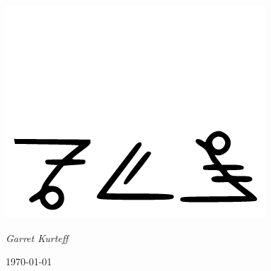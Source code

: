 \begin{titlepage}
\centering
	{\huge\bfseries \kurango \par}
	\begin{center}
	{\includegraphics[scale=0.3]{./img/kurango.png}}
	\end{center}
		\vspace{2cm}
	{\Large\itshape Garret Kurteff\par}
		\vfill
	{\large \today\par}
\end{titlepage}